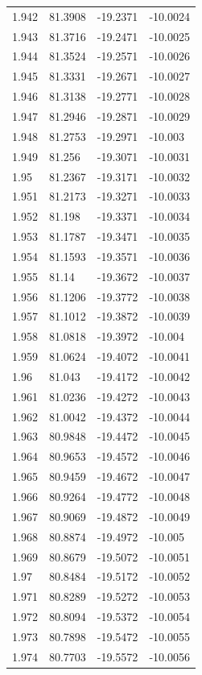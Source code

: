 \begin{tabular}{llll}
1.942 & 81.3908 & -19.2371 & -10.0024 \\
1.943 & 81.3716 & -19.2471 & -10.0025 \\
1.944 & 81.3524 & -19.2571 & -10.0026 \\
1.945 & 81.3331 & -19.2671 & -10.0027 \\
1.946 & 81.3138 & -19.2771 & -10.0028 \\
1.947 & 81.2946 & -19.2871 & -10.0029 \\
1.948 & 81.2753 & -19.2971 & -10.003 \\
1.949 & 81.256 & -19.3071 & -10.0031 \\
1.95 & 81.2367 & -19.3171 & -10.0032 \\
1.951 & 81.2173 & -19.3271 & -10.0033 \\
1.952 & 81.198 & -19.3371 & -10.0034 \\
1.953 & 81.1787 & -19.3471 & -10.0035 \\
1.954 & 81.1593 & -19.3571 & -10.0036 \\
1.955 & 81.14 & -19.3672 & -10.0037 \\
1.956 & 81.1206 & -19.3772 & -10.0038 \\
1.957 & 81.1012 & -19.3872 & -10.0039 \\
1.958 & 81.0818 & -19.3972 & -10.004 \\
1.959 & 81.0624 & -19.4072 & -10.0041 \\
1.96 & 81.043 & -19.4172 & -10.0042 \\
1.961 & 81.0236 & -19.4272 & -10.0043 \\
1.962 & 81.0042 & -19.4372 & -10.0044 \\
1.963 & 80.9848 & -19.4472 & -10.0045 \\
1.964 & 80.9653 & -19.4572 & -10.0046 \\
1.965 & 80.9459 & -19.4672 & -10.0047 \\
1.966 & 80.9264 & -19.4772 & -10.0048 \\
1.967 & 80.9069 & -19.4872 & -10.0049 \\
1.968 & 80.8874 & -19.4972 & -10.005 \\
1.969 & 80.8679 & -19.5072 & -10.0051 \\
1.97 & 80.8484 & -19.5172 & -10.0052 \\
1.971 & 80.8289 & -19.5272 & -10.0053 \\
1.972 & 80.8094 & -19.5372 & -10.0054 \\
1.973 & 80.7898 & -19.5472 & -10.0055 \\
1.974 & 80.7703 & -19.5572 & -10.0056 \\

\end{tabular}
